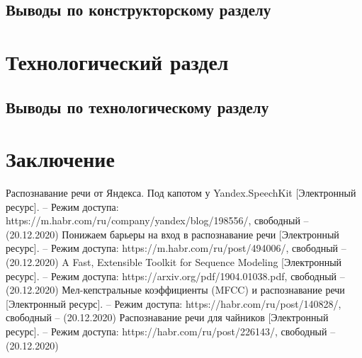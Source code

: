 \documentclass[a4paper,14pt]{extarticle}
\begin{document}
 	\subsection*{Выводы по конструкторскому разделу}
 	
 	\newpage
 	
 	\section{Технологический раздел}
 	
 	\subsection*{Выводы по технологическому разделу}
 	
 	\newpage
 	\section*{Заключение}
 	
 	\newpage
 	
 	\begin{thebibliography}{5}
 		Распознавание речи от Яндекса. Под капотом у Yandex.SpeechKit [Электронный ресурс]. – Режим доступа: 
 		https://m.habr.com/ru/company/yandex/blog/198556/, 
 		свободный – (20.12.2020)
 		Понижаем барьеры на вход в распознавание речи [Электронный ресурс]. – Режим доступа: 
 		https://m.habr.com/ru/post/494006/, 
 		свободный – (20.12.2020)
 		A Fast, Extensible Toolkit for Sequence Modeling [Электронный ресурс]. – Режим доступа: 
 		https://arxiv.org/pdf/1904.01038.pdf, 
 		свободный – (20.12.2020)
 		Мел-кепстральные коэффициенты (MFCC) и распознавание речи [Электронный ресурс]. – Режим доступа: 
 		https://habr.com/ru/post/140828/, 
 		свободный – (20.12.2020)
 		Распознавание речи для чайников
 		 [Электронный ресурс]. – Режим доступа: 
 		https://habr.com/ru/post/226143/, 
 		свободный – (20.12.2020)
 		
 	\end{thebibliography}
 
\end{document}
